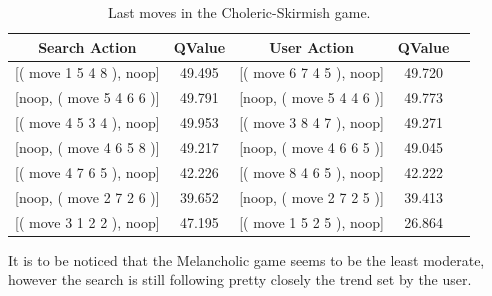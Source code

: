 \begin{table}[H]
	\caption{Last moves in the Choleric-Skirmish game.}
    \centering
    \scriptsize
    \begin{tabular}{|c|c|c|c|c|}
    \hline
    Search Action & QValue & User Action & QValue \\
        \hline
        {[( move 1 5 4 8 ), noop]} & 49.495 & {[( move 6 7 4 5 ), noop]} & 49.720\\
        {[noop, ( move 5 4 6 6 )]} & 49.791 & {[noop, ( move 5 4 4 6 )]} & 49.773\\
        {[( move 4 5 3 4 ), noop]} & 49.953 & {[( move 3 8 4 7 ), noop]} & 49.271\\
        {[noop, ( move 4 6 5 8 )]} & 49.217 & {[noop, ( move 4 6 6 5 )]} & 49.045\\
		{[( move 4 7 6 5 ), noop]} & 42.226 & {[( move 8 4 6 5 ), noop]} & 42.222\\
        {[noop, ( move 2 7 2 6 )]} & 39.652 & {[noop, ( move 2 7 2 5 )]} & 39.413\\
		{[( move 3 1 2 2 ), noop]} & 47.195 & {[( move 1 5 2 5 ), noop]} & 26.864\\
    \hline
    \end{tabular}
    \label{tab:cholski}
\end{table}
It is to be noticed that the Melancholic game seems to be the least moderate, however the search is still following pretty closely the trend set by the user.
